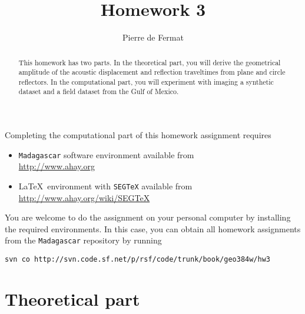 \author{Pierre de Fermat} 
\title{Homework 3}

\begin{abstract}
  This homework has two parts. In the theoretical part, you will
derive the geometrical amplitude of the acoustic displacement and
reflection traveltimes from plane and circle reflectors. In the
computational part, you will experiment with imaging a synthetic
dataset and a field dataset from the Gulf of Mexico.
\end{abstract}

Completing the computational part of this homework assignment requires
\begin{itemize}
\item \texttt{Madagascar} software environment available from \\
  \url{http://www.ahay.org}
\item \LaTeX\ environment with \texttt{SEGTeX} available from \\ 
  \url{http://www.ahay.org/wiki/SEGTeX}
\end{itemize}

You are welcome to do the assignment on your personal computer by
installing the required environments. In this case, you can obtain all
homework assignments from the \texttt{Madagascar} repository by running
\begin{verbatim}
svn co http://svn.code.sf.net/p/rsf/code/trunk/book/geo384w/hw3
\end{verbatim}

\section{Theoretical part}

